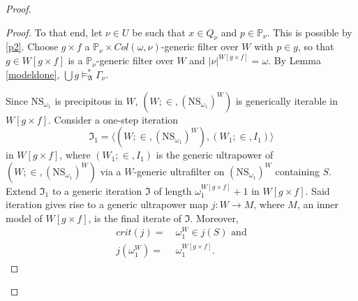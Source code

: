 \documentclass[12pt, twoside]{memoir}
\numberwithin{equation}{section}
\theoremstyle{definition}
\theoremstyle{remark}
\theoremstyle{definition}
\theoremstyle{definition}
\theoremstyle{definition}
\theoremstyle{remark}
\begin{document}
\begin{proof}
\begin{proof}
To that end, let $\nu \in U$ be such that $x \in Q_{\nu}$ and $p \in \mathbb{P}_{\nu}$. This is possible by \ref{p2}. Choose $g \times f$ a $\mathbb{P}_{\nu} \times Col(\omega, \nu)$-generic filter over $W$ with $p \in g$, so that $g \in W[g \times f]$ is a $\mathbb{P}_{\nu}$-generic filter over $W$ and $|\nu|^{W[g \times f]} = \omega$. By Lemma \ref{modeldone}, $\bigcup g \models^*_{\mathfrak{A}} \Gamma_{\nu}$.

Since $\mathrm{NS}_{\omega_1}$ is precipitous in $W$, $(W; \in, (\mathrm{NS}_{\omega_1})^W)$ is generically iterable in $W[g \times f]$. Consider a one-step iteration $$\mathfrak{I}_1 = \langle (W; \in, (\mathrm{NS}_{\omega_1})^W), (W_1; \in, I_1) \rangle$$ in $W[g \times f]$, where $(W_1; \in, I_1)$ is the generic ultrapower of $(W; \in, (\mathrm{NS}_{\omega_1})^W)$ via a $W$-generic ultrafilter on $(\mathrm{NS}_{\omega_1})^W$ containing $S$. Extend $\mathfrak{I}_1$ to a generic iteration $\mathfrak{I}$ of length $\omega_1^{W[g \times f]} + 1$ in $W[g \times f]$. Said iteration gives rise to a generic ultrapower map $j : W \longrightarrow M$, where $M$, an inner model of $W[g \times f]$, is the final iterate of $\mathfrak{I}$. Moreover, 
\begin{align*}
    crit(j) = \ & \omega_1^W \in j(S) \text{ and} \\
    j(\omega_1^W) = \ & \omega_1^{W[g \times f]} \text{.}
\end{align*}


\end{proof}
\end{proof}
\end{document}
